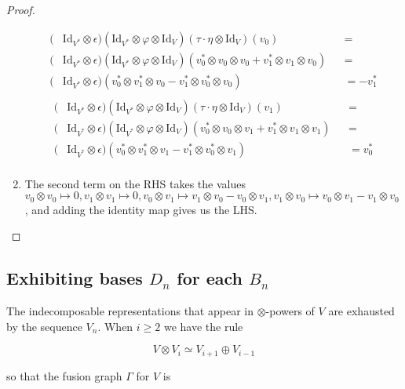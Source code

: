 \documentclass[11pt]{article} %
\begin{document}
\begin{proof}
\begin{enumerate}[$E_1$:]
\begin{align*}
(&\text{Id}_{V^{\ast}}\otimes \epsilon)(\text{Id}_{V^\ast} \otimes \varphi \otimes \text{Id}_V)(\tau \cdot \eta \otimes \text{Id}_V)(v_0) & &= \\
(&\text{Id}_{V^{\ast}}\otimes \epsilon)(\text{Id}_{V^\ast} \otimes \varphi \otimes \text{Id}_V)(v_0^{\ast} \otimes v_0 \otimes v_0 + v_1^{\ast} \otimes v_1 \otimes v_0) & &= \\
(&\text{Id}_{V^{\ast}}\otimes \epsilon)(v_0^{\ast} \otimes v_1^{\ast} \otimes v_0 - v_1^{\ast} \otimes v_0^{\ast} \otimes v_0) & &= -v_1^{\ast} \\
\end{align*}
\begin{align*}
(&\text{Id}_{V^{\ast}}\otimes \epsilon)(\text{Id}_{V^\ast} \otimes \varphi \otimes \text{Id}_V)(\tau \cdot \eta \otimes \text{Id}_V)(v_1) & &= \\
(&\text{Id}_{V^{\ast}}\otimes \epsilon)(\text{Id}_{V^\ast} \otimes \varphi \otimes \text{Id}_V)(v_0^{\ast} \otimes v_0 \otimes v_1 + v_1^{\ast} \otimes v_1 \otimes v_1) & &= \\
(&\text{Id}_{V^{\ast}}\otimes \epsilon)(v_0^{\ast} \otimes v_1^{\ast} \otimes v_1 - v_1^{\ast} \otimes v_0^{\ast} \otimes v_1) & &= v_0^{\ast}\\
\end{align*}

\item The second term on the RHS takes the values $v_0 \otimes v_0 \mapsto 0, v_1 \otimes v_1 \mapsto 0, v_0 \otimes v_1 \mapsto v_1 \otimes v_0 - v_0 \otimes v_1, v_1 \otimes v_0 \mapsto v_0 \otimes v_1 - v_1 \otimes v_0$, and adding the identity map gives us the LHS.
\end{enumerate}

\end{proof}

\subsection{Exhibiting bases $D_n$ for each $B_n$}

The indecomposable representations that appear in $\otimes$-powers of $V$ are exhausted by the sequence $V_n$. When $i \geq 2$ we have the rule

\begin{equation} \label{eq1}
V \otimes V_i \simeq V_{i+1} \oplus V_{i-1}
\end{equation}

so that the fusion graph $\Gamma$ for $V$ is
\end{document}
